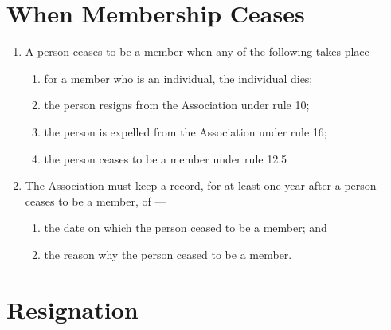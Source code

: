 \hypertarget{when-membership-ceases}{%
\section{When Membership Ceases}\label{when-membership-ceases}}

\begin{enumerate}

\item A person ceases to be a member when any of the following takes place ---

  \begin{enumerate}
  
  \item for a member who is an individual, the individual dies;
  \item the person resigns from the Association under rule 10;
  \item the person is expelled from the Association under rule 16;
  \item the person ceases to be a member under rule 12.5
  \end{enumerate}
\item The Association must keep a record, for at least one year after a person ceases to be a member, of ---

  \begin{enumerate}
  
  \item the date on which the person ceased to be a member; and
  \item the reason why the person ceased to be a member.
  \end{enumerate}
\end{enumerate}

\hypertarget{resignation}{%
\section{Resignation}\label{resignation}}

